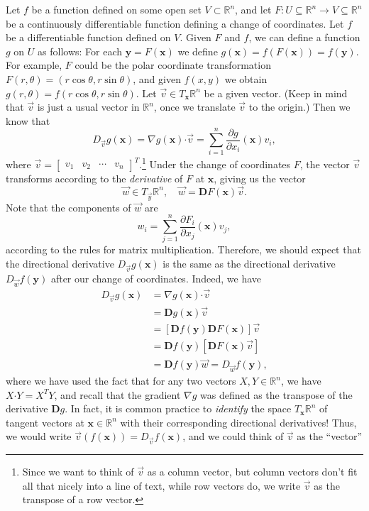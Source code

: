 \documentclass[12pt,letterpaper]{article}
\newcommand{\R}{\mathbb{R}}
\newcommand{\D}{\mathbf{D}}
\newcommand{\x}{\mathbf{x}}
\newcommand{\y}{\mathbf{y}}
\newcommand{\dotp}{\boldsymbol{\cdot}}
\begin{document}
Let $f$ be a function defined on some open set $V\subset \R^n$, and let $F:U\subseteq\R^n\to V\subseteq\R^n$ be a continuously differentiable function defining a change of coordinates. Let $f$ be a differentiable function defined on $V$. Given $F$ and $f$, we can define a function $g$ on $U$ as follows: For each $\y=F(\x)$ we define  $g(\x)=f(F(\x))=f(\y)$. For example, $F$ could be the polar coordinate transformation $F(r,\theta) = (r\cos\theta, r\sin\theta)$, and given $f(x,y)$ we obtain $g(r,\theta) = f(r\cos\theta,r\sin\theta)$.  Let $\vec{v}\in T_{\x}\R^n$ be a given vector. (Keep in mind that $\vec{v}$ is just a usual vector in $\R^n$, once we translate $\vec{v}$ to the origin.) Then we know that
\[
 D_{\vec{v}}g(\x) = \nabla g(\x)\dotp \vec{v} = \sum_{i=1}^n \frac{\partial g}{\partial x_i}(\x)v_i,
\]
where $\vec{v} = \begin{bmatrix} v_1 & v_2 & \cdots & v_n\end{bmatrix}^T$.\footnote{Since we want to think of $\vec{v}$ as a column vector, but column vectors don't fit all that nicely into a line of text, while row vectors do, we write $\vec{v}$ as the transpose of a row vector.} Under the change of coordinates $F$, the vector $\vec{v}$ transforms according to the {\em derivative} of $F$ at $\x$, giving us the vector
\[
 \vec{w}\in T_{\vec{y}}\R^n,\quad \vec{w} = \D F(\x)\vec{v}.
\]
Note that the components of $\vec{w}$ are 
\[
w_i = \sum_{j=1}^n \frac{\partial F_i}{\partial x_j}(\x)v_j,
\]
according to the rules for matrix multiplication. Therefore, we should expect that the directional derivative $D_{\vec{v}}g(\x)$ is the same as the directional derivative $D_{\vec{w}}f(\y)$ after our change of coordinates. Indeed, we have
\begin{align*}
D_{\vec{v}}g(\x) & = \nabla g(\x)\dotp \vec{v}\\
& = \D g(\x)\vec{v}\\
& = [\D f(\y)\D F(\x)]\vec{v}\\
& = \D f(\y) [\D F(\x)\vec{v}]\\
& = \D f(\y)\vec{w} = D_{\vec{w}}f(\y),
\end{align*}
where we have used the fact that for any two vectors $X,Y\in\R^n$, we have $X\dotp Y = X^TY$, and recall that the gradient $\nabla g$ was defined as the transpose of the derivative $\D g$. In fact, it is common practice to {\em identify} the space $T_\x\R^n$ of tangent vectors at $\x\in\R^n$ with their corresponding directional derivatives! Thus, we would write $\vec{v} (f(\x)) = D_{\vec{v}}f(\x)$, and we could think of $\vec{v}$ as the ``vector''
\end{document}
